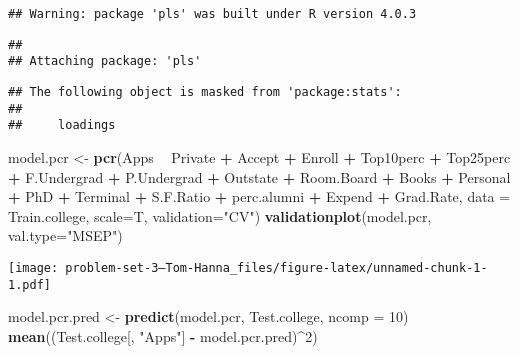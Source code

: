 \documentclass[
]{article}
\newenvironment{Shaded}{\begin{snugshade}}{\end{snugshade}}
\newcommand{\DataTypeTok}[1]{\textcolor[rgb]{0.13,0.29,0.53}{#1}}
\newcommand{\DecValTok}[1]{\textcolor[rgb]{0.00,0.00,0.81}{#1}}
\newcommand{\KeywordTok}[1]{\textcolor[rgb]{0.13,0.29,0.53}{\textbf{#1}}}
\newcommand{\NormalTok}[1]{#1}
\newcommand{\OperatorTok}[1]{\textcolor[rgb]{0.81,0.36,0.00}{\textbf{#1}}}
\newcommand{\StringTok}[1]{\textcolor[rgb]{0.31,0.60,0.02}{#1}}
\begin{document}
\begin{verbatim}
## Warning: package 'pls' was built under R version 4.0.3
\end{verbatim}

\begin{verbatim}
## 
## Attaching package: 'pls'
\end{verbatim}

\begin{verbatim}
## The following object is masked from 'package:stats':
## 
##     loadings
\end{verbatim}

\begin{Shaded}
\begin{Highlighting}[]
\NormalTok{model.pcr <-}\StringTok{ }\KeywordTok{pcr}\NormalTok{(Apps }\OperatorTok{~}\StringTok{ }\NormalTok{Private }\OperatorTok{+}\StringTok{ }\NormalTok{Accept }\OperatorTok{+}\StringTok{ }\NormalTok{Enroll }\OperatorTok{+}\StringTok{ }\NormalTok{Top10perc }\OperatorTok{+}\StringTok{ }\NormalTok{Top25perc }\OperatorTok{+}\StringTok{ }\NormalTok{F.Undergrad }\OperatorTok{+}\StringTok{ }\NormalTok{P.Undergrad }\OperatorTok{+}\StringTok{ }\NormalTok{Outstate }\OperatorTok{+}
\StringTok{                     }\NormalTok{Room.Board }\OperatorTok{+}\StringTok{ }\NormalTok{Books }\OperatorTok{+}\StringTok{ }\NormalTok{Personal }\OperatorTok{+}\StringTok{ }\NormalTok{PhD }\OperatorTok{+}\StringTok{ }\NormalTok{Terminal }\OperatorTok{+}\StringTok{ }\NormalTok{S.F.Ratio }\OperatorTok{+}\StringTok{ }\NormalTok{perc.alumni }\OperatorTok{+}\StringTok{ }\NormalTok{Expend }\OperatorTok{+}\StringTok{ }\NormalTok{Grad.Rate,}
                 \DataTypeTok{data =}\NormalTok{ Train.college, }\DataTypeTok{scale=}\NormalTok{T, }\DataTypeTok{validation=}\StringTok{"CV"}\NormalTok{)}
\KeywordTok{validationplot}\NormalTok{(model.pcr, }\DataTypeTok{val.type=}\StringTok{"MSEP"}\NormalTok{)}
\end{Highlighting}
\end{Shaded}

\texttt{[image: problem-set-3---Tom-Hanna\_files/figure-latex/unnamed-chunk-1-1.pdf]}

\begin{Shaded}
\begin{Highlighting}[]
\NormalTok{model.pcr.pred <-}\StringTok{ }\KeywordTok{predict}\NormalTok{(model.pcr, Test.college, }\DataTypeTok{ncomp =} \DecValTok{10}\NormalTok{)}
\KeywordTok{mean}\NormalTok{((Test.college[, }\StringTok{"Apps"}\NormalTok{] }\OperatorTok{-}\StringTok{ }\NormalTok{model.pcr.pred)}\OperatorTok{^}\DecValTok{2}\NormalTok{)}
\end{Highlighting}
\end{Shaded}
\end{document}
